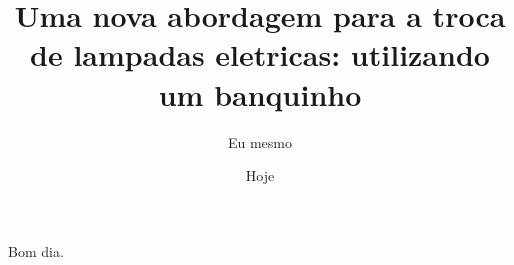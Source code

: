 \documentclass{article}
\author{Eu mesmo}
\date{Hoje}
\title{Uma nova abordagem para a troca de
       lampadas eletricas: utilizando um banquinho}
\begin{document}
\maketitle

Bom dia.
\end{document}
